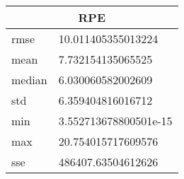 \begin{table}[!ht] 
 \centering 
 \begin{tabular}{|l|l|} \hline 
 \multicolumn{2}{|c|}{RPE} \\ \hline 
 rmse & 10.011405355013224 \\ \hline 
mean & 7.732154135065525 \\ \hline 
median & 6.030060582002609 \\ \hline 
std & 6.359404816016712 \\ \hline 
min & 3.552713678800501e-15 \\ \hline 
max & 20.754015717609576 \\ \hline 
sse & 486407.63504612626 \\ \hline 
\end{tabular} 
 \end{table}